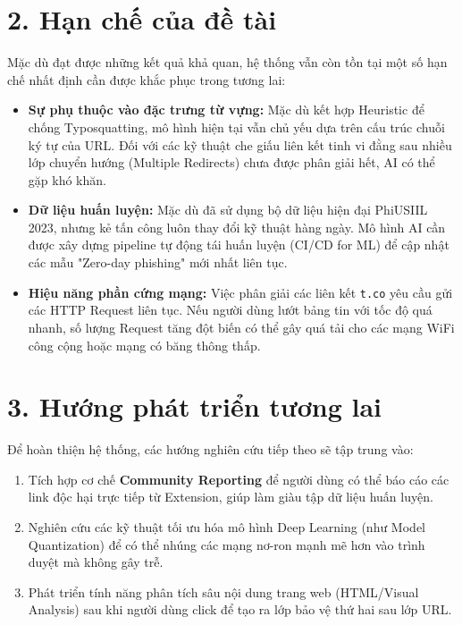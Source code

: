 \section*{2. Hạn chế của đề tài}

Mặc dù đạt được những kết quả khả quan, hệ thống vẫn còn tồn tại một số hạn chế nhất định cần được khắc phục trong tương lai:

\begin{itemize}
    \item \textbf{Sự phụ thuộc vào đặc trưng từ vựng:} Mặc dù kết hợp Heuristic để chống Typosquatting, mô hình hiện tại vẫn chủ yếu dựa trên cấu trúc chuỗi ký tự của URL. Đối với các kỹ thuật che giấu liên kết tinh vi đằng sau nhiều lớp chuyển hướng (Multiple Redirects) chưa được phân giải hết, AI có thể gặp khó khăn.
    \item \textbf{Dữ liệu huấn luyện:} Mặc dù đã sử dụng bộ dữ liệu hiện đại PhiUSIIL 2023, nhưng kẻ tấn công luôn thay đổi kỹ thuật hàng ngày. Mô hình AI cần được xây dựng pipeline tự động tái huấn luyện (CI/CD for ML) để cập nhật các mẫu "Zero-day phishing" mới nhất liên tục.
    \item \textbf{Hiệu năng phần cứng mạng:} Việc phân giải các liên kết \texttt{t.co} yêu cầu gửi các HTTP Request liên tục. Nếu người dùng lướt bảng tin với tốc độ quá nhanh, số lượng Request tăng đột biến có thể gây quá tải cho các mạng WiFi công cộng hoặc mạng có băng thông thấp.
\end{itemize}

\section*{3. Hướng phát triển tương lai}

Để hoàn thiện hệ thống, các hướng nghiên cứu tiếp theo sẽ tập trung vào:
\begin{enumerate}
    \item Tích hợp cơ chế \textbf{Community Reporting} để người dùng có thể báo cáo các link độc hại trực tiếp từ Extension, giúp làm giàu tập dữ liệu huấn luyện.
    \item Nghiên cứu các kỹ thuật tối ưu hóa mô hình Deep Learning (như Model Quantization) để có thể nhúng các mạng nơ-ron mạnh mẽ hơn vào trình duyệt mà không gây trễ.
    \item Phát triển tính năng phân tích sâu nội dung trang web (HTML/Visual Analysis) sau khi người dùng click để tạo ra lớp bảo vệ thứ hai sau lớp URL.
\end{enumerate}
